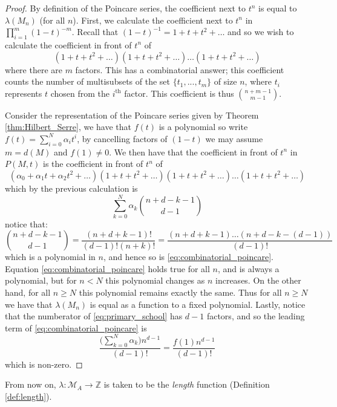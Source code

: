 \documentclass[12pt]{article}
\theoremstyle{plain}
\theoremstyle{definition}
\newcommand{\bb}[1]{\mathbb{#1}}
\newcommand{\call}[1]{\mathcal{#1}}
\newcommand{\lto}{\longrightarrow}
\begin{document}
\begin{proof}
By definition of the Poincare series, the coefficient next to $t^n$ is equal to $\lambda(M_n)$ (for all $n$). First, we calculate the coefficient next to $t^n$ in $\prod_{i = 1}^m(1 - t)^{-m}$. Recall that $(1 - t)^{-1} = 1 + t + t^2 + \hdots$ and so we wish to calculate the coefficient in front of $t^n$ of
\[(1 + t + t^2 + \hdots)(1 + t + t^2 + \hdots)\hdots (1 + t + t^2 + \hdots)\]
where there are $m$ factors. This has a combinatorial answer; this coefficient counts the number of multisubsets of the set $\lbrace t_1,...,t_m\rbrace$ of size $n$, where $t_i$ represents $t$ chosen from the $i^{\text{th}}$ factor. This coefficient is thus ${n + m - 1 \choose m - 1}$.

Consider the representation of the Poincare series given by Theorem \ref{thm:Hilbert_Serre}, we have that $f(t)$ is a polynomial so write $f(t) = \sum_{i = 0}^N \alpha_i t^i$, by cancelling factors of $(1 - t)$ we may assume $m = d(M)$ and $f(1) \neq 0$. We then have that the coefficient in front of $t^n$ in $P(M,t)$ is the coefficient in front of $t^n$ of
\[(\alpha_0 + \alpha_1t + \alpha_2t^2 + \hdots)(1 + t + t^2 + \hdots)(1 + t + t^2 + \hdots)\hdots (1 + t + t^2 + \hdots)\]
which by the previous calculation is
\begin{equation}
\label{eq:combinatorial_poincare}
\sum_{k = 0}^N\alpha_k{n  + d - k - 1 \choose d - 1}
\end{equation}
notice that:
\begin{equation}
\label{eq:primary_school}
{n  + d - k - 1 \choose d - 1} = \frac{(n + d + k - 1)!}{(d-1)!(n+k)!} = \frac{(n+d+k-1)\hdots(n+d-k-(d-1))}{(d-1)!}
\end{equation}
which is a polynomial in $n$, and hence so is \eqref{eq:combinatorial_poincare}. Equation \eqref{eq:combinatorial_poincare} holds true for all $n$, and is always a polynomial, but for $n < N$ this polynomial changes as $n$ increases. On the other hand, for all $n \geq N$ this polynomial remains exactly the same. Thus for all $n \geq N$ we have that $\lambda(M_n)$ is equal as a function to a fixed polynomial. Lastly, notice that the numberator of \eqref{eq:primary_school} has $d - 1$ factors, and so the leading term of \eqref{eq:combinatorial_poincare} is \[\frac{\big(\sum_{k = 0}^N\alpha_k\big)n^{d-1}}{(d-1)!} = \frac{f(1)n^{d-1}}{(d-1)!}\] which is non-zero.
\end{proof}
From now on, $\lambda: \call{M}_A \lto \bb{Z}$ is taken to be the \emph{length} function (Definition \ref{def:length}).
\end{document}
